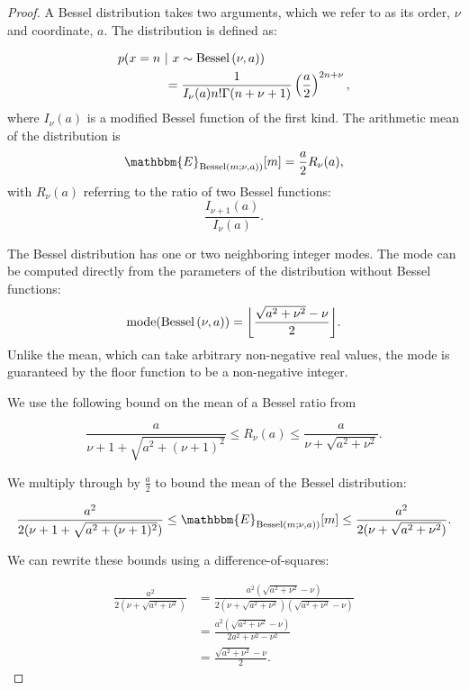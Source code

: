 \documentclass{article}
\newcommand{\Bess}[1]{\textup{Bessel}\left( #1 \right)}
\newcommand{\besv}{order}
\newcommand{\besa}{coordinate}
\begin{document}
\begin{proof}
  A Bessel distribution takes two arguments, which we refer to as its \besv,
  $\nu$ and \besa, $a$. The distribution is defined as:

  \begin{align}
      p(x = n~&|~x \sim \Bess{\nu, a})\notag \\
      &= \frac{1}{I_{\nu}(a)n!\Gamma(n + \nu + 1)} \left( \frac{a}{2} \right)^{2n + \nu},   
  \end{align}
  where $I_{\nu}(a)$ is a modified Bessel function of the first kind. The
  arithmetic mean of the distribution is
  \[
      \mathbbm{E}_{\Bess{m; \nu, a})}[m] = \frac{a}{2} R_{\nu}(a),
  \]
  with $R_{\nu}(a)$ referring to the ratio of two Bessel functions:
  \[
      \frac{I_{\nu + 1}(a)}{I_{\nu}(a)}.
  \]

  The Bessel distribution has one or two neighboring integer modes. The mode can
  be computed directly from the parameters of the distribution without Bessel
  functions:
  \[
      \textup{mode}(\Bess{\nu, a}) = \bigg \lfloor \frac{\sqrt{a^2 + \nu^2} - \nu}{2} \bigg \rfloor.
  \]
  Unlike the mean, which can take arbitrary non-negative real values, the mode
  is guaranteed by the floor function to be a non-negative integer.

  We use the following bound on the mean of a Bessel ratio from
  \citet{devroye2002simulating}

  \begin{equation}
      \frac{a}{\nu + 1 + \sqrt{a^2 + (\nu + 1)^2}} \leq R_{\nu}(a)
      \leq \frac{a}{\nu + \sqrt{a^2 + \nu^2}}.
  \end{equation}

  We multiply through by $\frac{a}{2}$ to bound the mean of the Bessel
  distribution:

  \begin{equation}
      \frac{a^2}{2(\nu + 1 + \sqrt{a^2 + (\nu + 1)^2})} \leq \mathbbm{E}_{\Bess{m; \nu, a})}[m]
      \leq \frac{a^2}{2(\nu + \sqrt{a^2 + \nu^2})}.
  \end{equation}

  We can rewrite these bounds using a difference-of-squares:

  \begin{align*}
      \frac{a^2}{2(\nu + \sqrt{a^2 + \nu^2})} &= 
      \frac{a^2(\sqrt{a^2 + \nu^2} - \nu)}{2(\nu + \sqrt{a^2 + \nu^2})(\sqrt{a^2 + \nu^2} - \nu)} \\
      &= \frac{a^2(\sqrt{a^2 + \nu^2} - \nu)}{2a^2 + \nu^2 - \nu^2} \\
      &= \frac{\sqrt{a^2 + \nu^2} - \nu}{2}.
  \end{align*}


\end{proof}
\end{document}
